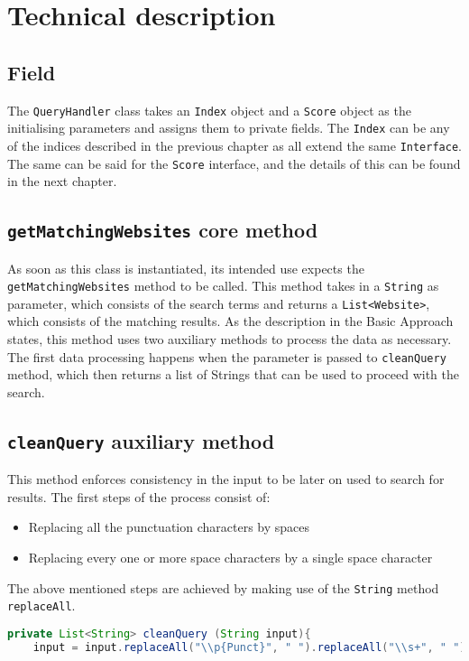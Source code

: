 \section{Technical description} %
\subsection{Field}
The {\tt QueryHandler} class takes an {\tt Index} object and a {\tt Score} object as the initialising parameters and assigns them to private fields. The {\tt Index} can be any of the indices described in the previous chapter as all extend the same {\tt Interface}. The same can be said for the {\tt Score} interface, and the details of this can be found in the next chapter. %
\subsection{{\tt getMatchingWebsites} core method}
As soon as this class is instantiated, its intended use expects the {\tt getMatchingWebsites} method to be called. This method takes in a {\tt String} as parameter, which consists of the search terms and returns a {\tt List<Website>}, which consists of the matching results. %
As the description in the Basic Approach states, this method uses two auxiliary methods to process the data as necessary. The first data processing happens when the parameter is passed to {\tt cleanQuery} method, which then returns a list of Strings that can be used to proceed with the search. %
\subsection{{\tt cleanQuery} auxiliary method}
This method enforces consistency in the input to be later on used to search for results.
The first steps of the process consist of:
\begin{itemize}
    \item Replacing all the punctuation characters by spaces
    \item Replacing every one or more space characters by a single space character
\end{itemize}
The above mentioned steps are achieved by making use of the {\tt String} method {\tt replaceAll}.

\begin{lstlisting}[language=Java]
private List<String> cleanQuery (String input){
    input = input.replaceAll("\\p{Punct}", " ").replaceAll("\\s+", " ");
\end{lstlisting}

